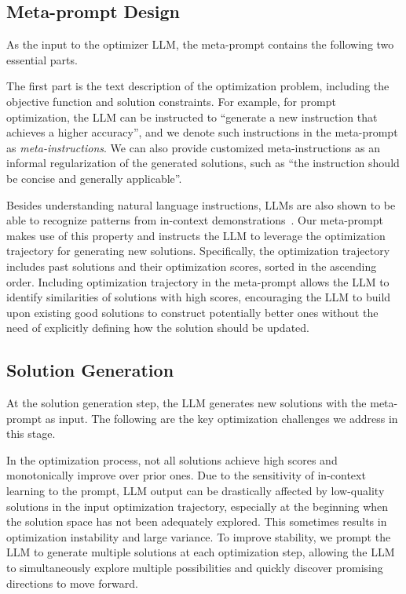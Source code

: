 \subsection{Meta-prompt Design}

As the input to the optimizer LLM, the meta-prompt contains the following two essential parts.

The first part is the text description of the optimization problem, including the objective function and solution constraints. 
For example, for prompt optimization, the LLM can be instructed to ``generate a new instruction that achieves a higher accuracy'', and we denote such instructions in the meta-prompt as \emph{meta-instructions}. 
We can also provide customized meta-instructions as an informal regularization of the generated solutions, such as ``the instruction should be concise and generally applicable''.

Besides understanding natural language instructions, LLMs are also shown to be able to recognize patterns from in-context demonstrations~\citep{wei2023larger,madaan2022text,mirchandani2023large}. 
Our meta-prompt makes use of this property and instructs the LLM to leverage the optimization trajectory for generating new solutions. 
Specifically, the optimization trajectory includes past solutions and their optimization scores, sorted in the ascending order. 
Including optimization trajectory in the meta-prompt allows the LLM to identify similarities of solutions with high scores, encouraging the LLM to build upon existing good solutions to construct potentially better ones without the need of explicitly defining how the solution should be updated.

\subsection{Solution Generation}

At the solution generation step, the LLM generates new solutions with the meta-prompt as input. 
The following are the key optimization challenges we address in this stage.

 In the optimization process, not all solutions achieve high scores and monotonically improve over prior ones. 
Due to the sensitivity of in-context learning to the prompt, LLM output can be drastically affected by low-quality solutions in the input optimization trajectory, especially at the beginning when the solution space has not been adequately explored. 
This sometimes results in optimization instability and large variance. 
To improve stability, we prompt the LLM to generate multiple solutions at each optimization step, allowing the LLM to simultaneously explore multiple possibilities and quickly discover promising directions to move forward.

